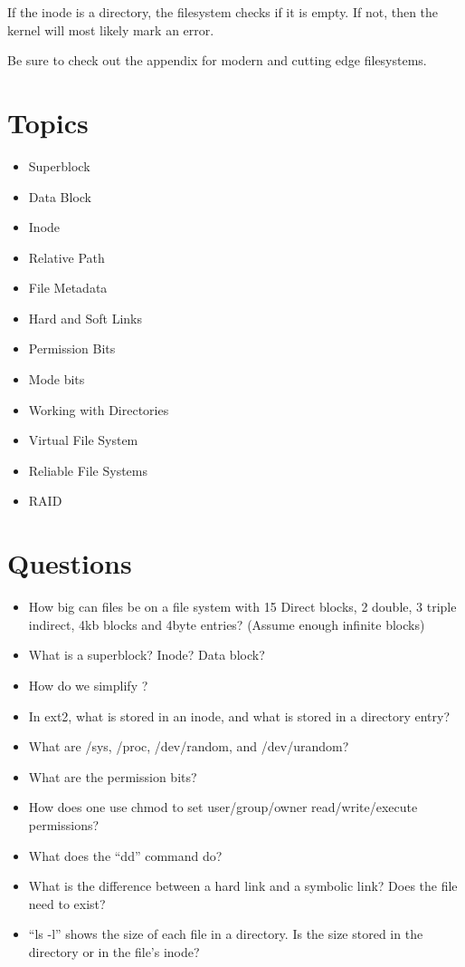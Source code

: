 If the inode is a directory, the filesystem checks if it is empty.
If not, then the kernel will most likely mark an error.

Be sure to check out the appendix for modern and cutting edge filesystems.

\section{Topics}

\begin{itemize}
\tightlist
\item
  Superblock
\item
  Data Block
\item
  Inode
\item
  Relative Path
\item
  File Metadata
\item
  Hard and Soft Links
\item
  Permission Bits
\item
  Mode bits
\item
  Working with Directories
\item
  Virtual File System
\item
  Reliable File Systems
\item
  RAID
\end{itemize}

\section{Questions}

\begin{itemize}
\tightlist
\item
  How big can files be on a file system with 15 Direct blocks, 2 double, 3 triple indirect, 4kb blocks and 4byte entries? (Assume enough infinite blocks)
\item
  What is a superblock? Inode? Data block?
\item
  How do we simplify ?
\item
  In ext2, what is stored in an inode, and what is stored in a directory entry?
\item
  What are /sys, /proc, /dev/random, and /dev/urandom?
\item
  What are the permission bits?
\item
  How does one use chmod to set user/group/owner read/write/execute permissions?
\item
  What does the ``dd'' command do?
\item
  What is the difference between a hard link and a symbolic link? Does the file need to exist?
\item
  ``ls -l'' shows the size of each file in a directory.
    Is the size stored in the directory or in the file's inode?
\end{itemize}



